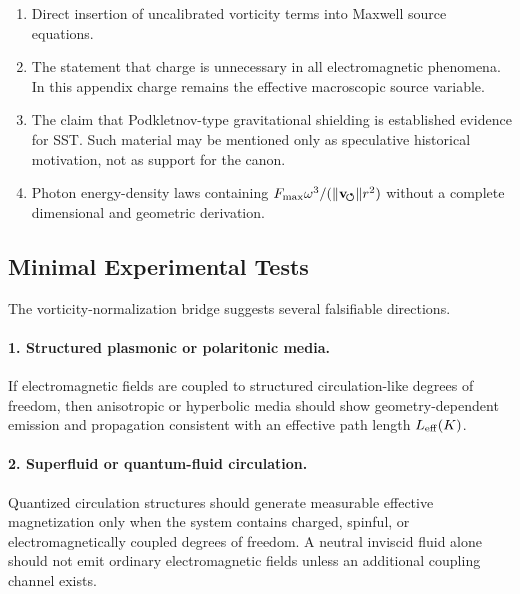     \begin{enumerate}
        \item Direct insertion of uncalibrated vorticity terms into Maxwell
        source equations.
        
        \item The statement that charge is unnecessary in all electromagnetic
        phenomena.  In this appendix charge remains the effective macroscopic
        source variable.
        
        \item The claim that Podkletnov-type gravitational shielding is
        established evidence for SST.  Such material may be mentioned only as
        speculative historical motivation, not as support for the canon.
        
        \item Photon energy-density laws containing
        \(F_{\max}\omega^3/(\lVert\mathbf{v}_{\!\boldsymbol{\circlearrowleft}}\rVert r^2)\) without a complete dimensional and
        geometric derivation.
    \end{enumerate}

\subsection{Minimal Experimental Tests}
    
    The vorticity-normalization bridge suggests several falsifiable directions.
    
    \paragraph{1. Structured plasmonic or polaritonic media.}
        If electromagnetic fields are coupled to structured circulation-like
        degrees of freedom, then anisotropic or hyperbolic media should show
        geometry-dependent emission and propagation consistent with an effective
        path length \(L_{\rm eff}(K)\).
    
    \paragraph{2. Superfluid or quantum-fluid circulation.}
        Quantized circulation structures should generate measurable effective
        magnetization only when the system contains charged, spinful, or
        electromagnetically coupled degrees of freedom.  A neutral inviscid fluid
        alone should not emit ordinary electromagnetic fields unless an additional
        coupling channel exists.
    
